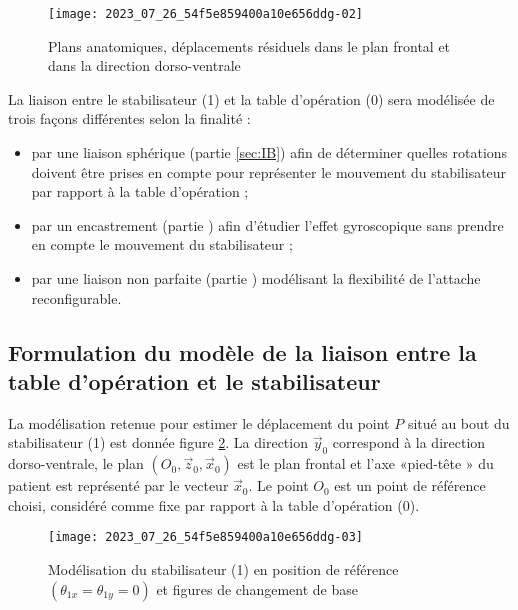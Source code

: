 \begin{figure}[!h]
\centering
\texttt{[image: 2023\_07\_26\_54f5e859400a10e656ddg-02]}
\caption{Plans anatomiques, déplacements résiduels dans le plan frontal et dans la direction dorso-ventrale\label{fig_ccspsi2022:04}}
\end{figure}



La liaison entre le stabilisateur (1) et la table d'opération (0) sera modélisée de trois façons différentes selon la finalité :

\begin{itemize}
  \item par une liaison sphérique (partie \ref{sec:IB}) afin de déterminer quelles rotations doivent être prises en compte pour représenter le mouvement du stabilisateur par rapport à la table d'opération ;
  \item par un encastrement (partie \label{sec:IIA}) afin d'étudier l'effet gyroscopique sans prendre en compte le mouvement du stabilisateur ;
  \item par une liaison non parfaite (partie \label{sec:IIC}) modélisant la flexibilité de l'attache reconfigurable.
\end{itemize}

\subsection{\label{sec:I.B}Formulation du modèle de la liaison entre la table d'opération et le stabilisateur}
La modélisation retenue pour estimer le déplacement du point $P$ situé au bout du stabilisateur (1) est donnée figure \ref{fig_ccspsi2022:05}. La direction $\vec{y}_{0}$ correspond à la direction dorso-ventrale, le plan $\left(O_{0}, \vec{z}_{0}, \vec{x}_{0}\right)$ est le plan frontal et l'axe «pied-tête » du patient est représenté par le vecteur $\vec{x}_{0}$. Le point $O_{0}$ est un point de référence choisi, considéré comme fixe par rapport à la table d'opération (0).

\begin{figure}[!h]
\centering
\texttt{[image: 2023\_07\_26\_54f5e859400a10e656ddg-03]}
\caption{Modélisation du stabilisateur (1) en position de référence $\left(\theta_{1 x}=\theta_{1 y}=0\right)$ et figures de changement de base\label{fig_ccspsi2022:05}}
\end{figure}


